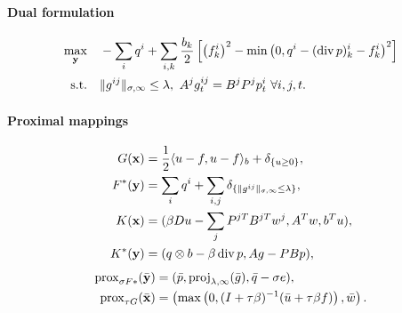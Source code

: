\paragraph{Dual formulation}
\begin{align*}
    \max_{\mathbf{y}} \quad
        & -\sum_i q^i
            + \sum_{i,k} \frac{b_k}{2} \left [
                \left(f_k^i\right)^2
                - \min\left(0, q^i - (\operatorname{div}{p})_k^i - f_k^i\right)^2
            \right ] \\
    \text{s.t.}\quad
        & \|g^{ij}\|_{\sigma,\infty} \leq \lambda,
          ~A^j g^{ij}_t = B^j P^j p^i_t ~\forall i,j,t.
\end{align*}

\paragraph{Proximal mappings}
\begin{align*}
    G(\mathbf{x}) &= \frac{1}{2} \langle u-f, u-f \rangle_b
        + \delta_{\{u \geq 0\}}, \\
    F^*(\mathbf{y}) &= \sum_{i} q^i
        + \sum_{i,j} \delta_{\{\|g^{ij}\|_{\sigma,\infty} \leq \lambda\}}, \\
    K(\mathbf{x}) &= (\beta Du - \sum_j P^{jT}B^{jT}w^{j}, A^T w, b^T u), \\
    K^*(\mathbf{y}) &= (q \otimes b - \beta \operatorname{div}{p}, A g - PBp),
\end{align*}
\begin{align*}
    \operatorname{prox}_{\sigma F*}(\bar{\mathbf{y}})
    &= (
        \bar{p},
        \operatorname{proj}_{\lambda,\infty}(\bar{g}),
        \bar{q}-\sigma e
    ), \\
    \operatorname{prox}_{\tau G}(\bar{\mathbf{x}})
    &= \left(
        \max\left(0,(I+\tau \beta)^{-1}(\bar{u} + \tau \beta f)\right),
        \bar{w}
    \right).
\end{align*}

